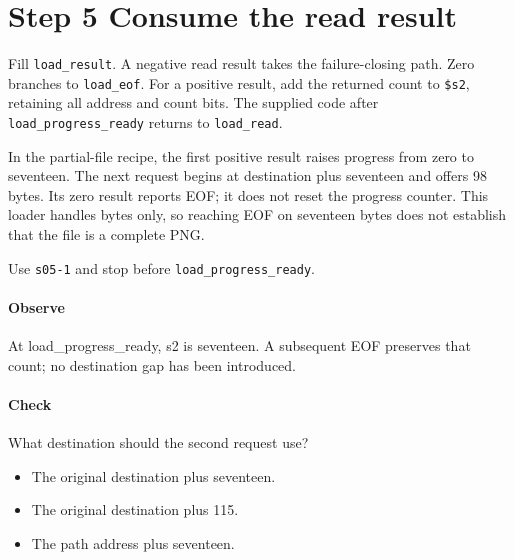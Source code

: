 \section{Step 5 Consume the read result}\label{png-load-s05}
Fill \texttt{load\_result}. A negative read result takes the failure-closing path. Zero branches to \texttt{load\_eof}. For a positive result, add the returned count to \texttt{\$s2}, retaining all address and count bits. The supplied code after \texttt{load\_progress\_ready} returns to \texttt{load\_read}.

In the partial-file recipe, the first positive result raises progress from zero to seventeen. The next request begins at destination plus seventeen and offers 98 bytes. Its zero result reports EOF; it does not reset the progress counter. This loader handles bytes only, so reaching EOF on seventeen bytes does not establish that the file is a complete PNG.

Use \texttt{s05-1} and stop before \texttt{load\_progress\_ready}.

\paragraph{Observe} At load\_progress\_ready, s2 is seventeen. A subsequent EOF preserves that count; no destination gap has been introduced.

\paragraph{Check} What destination should the second request use?
\begin{itemize}
  \item[A.] The original destination plus seventeen.
  \item[B.] The original destination plus 115.
  \item[C.] The path address plus seventeen.
\end{itemize}
